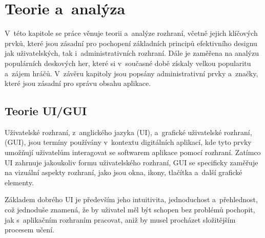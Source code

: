 \chapter{Teorie a~analýza}
\label{ch:theory_and_analysis}
V~této kapitole se práce věnuje teorii a~analýze rozhraní, včetně jejich klíčových prvků, které jsou zásadní pro pochopení základních principů efektivního designu jak uživatelských, tak i~administrativních rozhraní. Dále je zaměřena na analýzu populárních deskových her, které si v~současné době získaly velkou popularitu a~zájem hráčů. V~závěru kapitoly jsou popsány administrativní prvky a~značky, které jsou zásadní pro správu obsahu aplikace.

\section{Teorie UI/GUI}
\label{sec:ui-gui-theory}
Uživatelské rozhraní, z~anglického jazyka \textit{} (UI), a~grafické uživatelské rozhraní, \textit{} (GUI), jsou termíny používány v~kontextu digitálních aplikací, kde tyto prvky umožňují uživatelům interagovat se softwarem aplikace pomocí rozhraní. Zatímco UI zahrnuje jakoukoliv formu uživatelského rozhraní, GUI se specificky zaměřuje na vizuální aspekty rozhraní, jako jsou okna, ikony, tlačítka a~další grafické elementy.

Základem dobrého UI je především jeho intuitivita, jednoduchost a~přehlednost, což jednoduše znamená, že by uživatel měl být schopen bez problémů pochopit, jak s~aplikačním rozhraním pracovat, aniž by musel procházet složitějším procesem učení.


